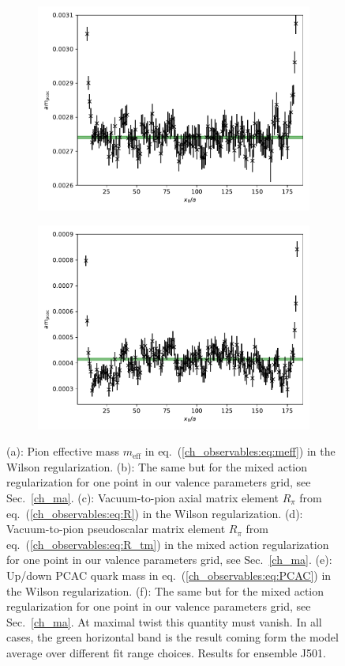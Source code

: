 \begin{figure}
\begin{subfigure}{.49\textwidth}
    	\includegraphics[width=\textwidth]{./cap3/figs/J501_mpcac.pdf}
    	\caption{}
    \end{subfigure}
    \begin{subfigure}{.49\textwidth}
    	\includegraphics[width=\textwidth]{./cap3/figs/J501_mpcac_tm.pdf}
    	\caption{}
    \end{subfigure}
    \caption{(a): Pion effective mass $m_{\textrm{eff}}$ in eq.~(\ref{ch_observables:eq:meff}) in the Wilson regularization. (b): The same but for the mixed action regularization for one point in our valence parameters grid, see Sec.~\ref{ch_ma}. (c): Vacuum-to-pion axial matrix element $R_{\pi}$ from eq.~(\ref{ch_observables:eq:R}) in the Wilson regularization. (d): Vacuum-to-pion pseudoscalar matrix element $R_{\pi}$ from eq.~(\ref{ch_observables:eq:R_tm}) in the mixed action regularization for one point in our valence parameters grid, see Sec.~\ref{ch_ma}. (e): Up/down PCAC quark mass in eq.~(\ref{ch_observables:eq:PCAC}) in the Wilson regularization. (f): The same but for the mixed action regularization for one point in our valence parameters grid, see Sec.~\ref{ch_ma}. At maximal twist this quantity must vanish. In all cases, the green horizontal band is the result coming form the model average over different fit range choices. Results for ensemble J501.}
        \label{ch_observables:fig:meff}
\end{figure}

